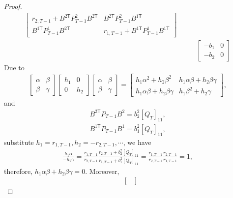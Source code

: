 \documentclass[letterpaper, 10 pt, conference]{ieeeconf}  %
\newcommand{\transpose}{\mathsf{T}}
\begin{document}
\begin{proof}
\begin{align*}
\begin{bmatrix}
            r_{2,T-1}+B^{2\transpose}P_{T-1}^{2}B^{2\transpose} & B^{2\transpose}P_{T-1}^{2}B^{1\transpose}\\
            B^{1\transpose}P_{T-1}^{1}B^{2\transpose} & r_{1,T-1}+B^{1\transpose}P_{T-1}^{1}B^{1\transpose}
        \end{bmatrix}\\
        &\qquad \begin{bmatrix}
            -b_{1} & 0\\
            -b_{2} & 0
        \end{bmatrix}
    \end{align*}
    Due to
    \begin{align*}
        \begin{bmatrix}
            \alpha & \beta\\
            \beta & \gamma
        \end{bmatrix}
        \begin{bmatrix}
            h_{1} & 0\\
            0 & h_{2}
        \end{bmatrix}
        \begin{bmatrix}
            \alpha & \beta\\
            \beta & \gamma
        \end{bmatrix} = 
        \begin{bmatrix}
            h_{1}\alpha^{2}+h_{2}\beta^{2} & h_{1}\alpha\beta + h_{2}\beta\gamma\\
            h_{1}\alpha\beta + h_{2}\beta\gamma & h_{1}\beta^{2} + h_{2}\gamma
        \end{bmatrix},
    \end{align*}
    and
    \begin{align*}
        B^{2\transpose}P_{T-1}B^{2} = b_{2}^{2}[Q_{T}]_{11},\\
        B^{1\transpose}P_{T-1}B^{1} = b_{1}^{2}[Q_{T}]_{11},
    \end{align*}
    substitute $h_{1} = r_{1,T-1}, h_{2}=-r_{2,T-1},\cdots$, we have
    \begin{align*}
        \frac{h_{1}\alpha}{-h_{2}\gamma} = \frac{r_{1,T-1}}{r_{2,T-1}}\frac{r_{2,T-1}+b_{2}^{2}[Q_{T}]_{11}}{r_{1,T-1}+b_{1}^{2}[Q_{T}]_{11}} = \frac{r_{1,T-1}}{r_{2,T-1}}\frac{r_{2,T-1}}{r_{1,T-1}} = 1,
    \end{align*}
    therefore, $h_{1}\alpha\beta + h_{2}\beta\gamma=0$.
    Moreover,
    \begin{align*}
        &
        \begin{bmatrix}

\end{bmatrix}
\end{align*}
\end{proof}
\end{document}
